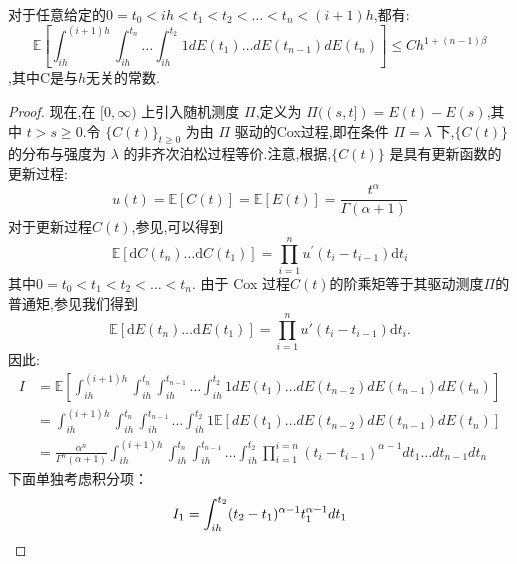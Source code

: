 \begin{lemma}\label{main lemma}
	对于任意给定的$0 = t_0 < ih < t_1 < t_2 < \ldots <t_n <(i+1)h$,都有:
	\begin{equation}
		\mathbb{E}\left[\int_{ih}^{(i+1)h}
		\int_{ih}^{t_n} \ldots \int_{ih}^{t_2} 1 dE(t_1) \ldots dE(t_{n-1})dE(t_n)\right] \le Ch^{1+(n-1)\beta}
	\end{equation}
	,其中C是与$h$无关的常数.
\end{lemma}


\begin{proof}    
	现在,在 $[0, \infty)$ 上引入随机测度 $\Pi$,定义为 $\Pi((s, t]) = E(t) - E(s)$,其中 $t > s \geq 0$.令 $\{C(t)\}_{t \geq 0}$ 为由 $\Pi$ 驱动的Cox过程,即在条件 $\Pi = \lambda$ 下,$\{C(t)\}$ 的分布与强度为 $\lambda$ 的非齐次泊松过程等价.注意,根据\cite{kingman1964doubly},$\{C(t)\}$ 是具有更新函数的更新过程:
	\begin{equation}
		u(t) = \mathbb{E}[C(t)] = \mathbb{E}[E(t)] = \frac{t^\alpha}{\Gamma(\alpha+1)}
	\end{equation}
	对于更新过程$C(t)$,参见\cite{daley2003introduction},可以得到
	\begin{equation*}
		\mathbb{E}[\mathrm{d}C(t_n)\ldots\mathrm{d}C(t_1)] = \prod_{i=1}^n u^{\prime}(t_i - t_{i-1})\mathrm{d}t_i
	\end{equation*}
	其中$0 = t_0 < t_1 < t_2 < \ldots <t_n$. 由于 Cox 过程$C(t)$的阶乘矩等于其驱动测度$\Pi$的普通矩,参见\cite{daley2003introduction}我们得到
	\begin{equation*}
		\mathbb{E}[\mathrm dE(t_n)\ldots\mathrm dE(t_1)]=\prod_{i=1}^nu'(t_i-t_{i-1})\mathrm dt_i.
	\end{equation*}
	因此:
	\begin{align*}
		I &= \mathbb{E}\left[\int_{ih}^{(i+1)h}
		\int_{ih}^{t_n}\int_{ih}^{t_{n-1}} \ldots \int_{ih}^{t_{2}} 1 dE(t_1) \ldots dE(t_{n-2})dE(t_{n-1})dE(t_n)\right] \\
		& = \int_{ih}^{(i+1)h}\int_{ih}^{t_n}\int_{ih}^{t_{n-1}}
		\ldots \int_{ih}^{t_{2}} 1 \mathbb{E}\left[dE(t_1) \ldots dE(t_{n-2})dE(t_{n-1})dE(t_n)\right] \\
		& = \frac{\alpha^n}{\Gamma^n(\alpha+1)}
		\int_{ih}^{(i+1)h}\int_{ih}^{t_n}\int_{ih}^{t_{n-1}} \ldots \int_{ih}^{t_{2}} \prod_{i=1}^{i=n}(t_i-t_{i-1})^{\alpha -1} dt_1 \ldots dt_{n-1}dt_n
	\end{align*}
	下面单独考虑积分项：
	\begin{equation*}
		I_{1}=\int_{ih}^{t_{2}} (t_{2}-t_1)^{\alpha -1} t_1^{\alpha - 1} dt_1 \\

\end{equation*}
\end{proof}
